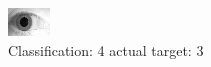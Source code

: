 \begin{figure}[h!]
\begin{center}
\includegraphics[width=0.60\columnwidth]{figures/ID1910_class_4_target_3.png}
\end{center}
\caption{ Classification: 4 actual target: 3}
\label{fig:ID1910_class_4_target_3}
\end{figure}
